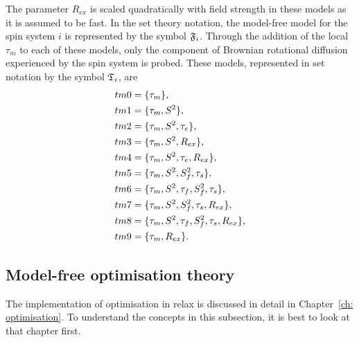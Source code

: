 \begin{htmlonly}
\begin{htmlonly}
\noindent The parameter $R_{ex}$ is scaled quadratically with field strength in these models as it is assumed to be fast.
In the set theory notation, the model-free model for the spin system $i$ is represented by the symbol $\mathfrak{F}_i$.
Through the addition of the local $\tau_m$ to each of these models, only the component of Brownian rotational diffusion experienced by the spin system is probed.
These models, represented in set notation by the symbol $\mathfrak{T}_i$, are
\begin{subequations}
\renewcommand{\theequation}{\theparentequation .\arabic{equation}}
\addtocounter{equation}{-1}
\begin{align}
 tm0 &= \{\tau_m\},                                     \label{model: tm0} \\
 tm1 &= \{\tau_m, S^2\},                                \label{model: tm1} \\
 tm2 &= \{\tau_m, S^2, \tau_e\},                        \label{model: tm2} \\
 tm3 &= \{\tau_m, S^2, R_{ex}\},                        \label{model: tm3} \\
 tm4 &= \{\tau_m, S^2, \tau_e, R_{ex}\},                \label{model: tm4} \\
 tm5 &= \{\tau_m, S^2, S^2_f, \tau_s\},                 \label{model: tm5} \\
 tm6 &= \{\tau_m, S^2, \tau_f, S^2_f, \tau_s\},         \label{model: tm6} \\
 tm7 &= \{\tau_m, S^2, S^2_f, \tau_s, R_{ex}\},         \label{model: tm7} \\
 tm8 &= \{\tau_m, S^2, \tau_f, S^2_f, \tau_s, R_{ex}\}, \label{model: tm8} \\
 tm9 &= \{\tau_m, R_{ex}\}.                             \label{model: tm9}
\end{align}
\end{subequations}





\subsection{Model-free optimisation theory}

The implementation of optimisation in relax is discussed in detail in Chapter~\ref{ch: optimisation}.
To understand the concepts in this subsection, it is best to look at that chapter first.



\end{htmlonly}
\end{htmlonly}
